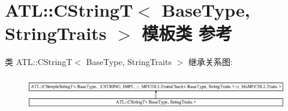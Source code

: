 \hypertarget{class_a_t_l_1_1_c_string_t}{}\section{A\+TL\+:\+:C\+StringT$<$ Base\+Type, String\+Traits $>$ 模板类 参考}
\label{class_a_t_l_1_1_c_string_t}
类 A\+TL\+:\+:C\+StringT$<$ Base\+Type, String\+Traits $>$ 继承关系图\+:\begin{figure}[H]
\begin{center}
\leavevmode
\includegraphics[height=1.536351cm]{class_a_t_l_1_1_c_string_t}
\end{center}
\end{figure}

